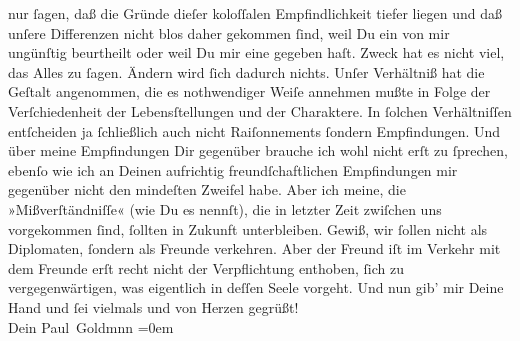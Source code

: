 \begin{ledgroupsized}[t]{13cm}
               nur ſagen, daß die Gründe dieſer koloſſalen Empfindlichkeit tiefer liegen und daß
               unſere Differenzen nicht blos daher gekommen ſind, weil Du ein \label{K_L03194-11v}\label{K_L03194-11h} von mir ungünſtig beurtheilt  oder weil Du mir eine \label{K_L03194-12v}\label{K_L03194-12h} gegeben haſt.\pend
           \pstart
           Zweck hat es nicht viel, das Alles zu ſagen. Ändern wird ſich dadurch nichts. Unſer
               Verhältniß hat die Geſtalt angenommen, {\pb}die es
               nothwendiger Weiſe annehmen mußte in Folge der Verſchiedenheit der Lebensſtellungen
               und der Charaktere. In ſolchen Verhältniſſen entſcheiden ja ſchließlich auch nicht
               Raiſonnements ſondern Empfindungen. Und über meine Empfindungen Dir gegenüber brauche
               ich wohl nicht erſt zu ſprechen, ebenſo wie ich an Deinen aufrichtig
               freundſchaftlichen Empfindungen  mir gegenüber
               nicht den mindeſten Zweifel habe. Aber ich meine, die »Mißverſtändniſſe« (wie Du es
               nennſt), die in letzter Zeit zwiſchen uns vorgekommen ſind, ſollten in Zukunft
               unterbleiben. Gewiß, wir ſollen nicht als Diplomaten, ſondern als Freunde verkehren.
               Aber der Freund iſt im Verkehr mit dem Freunde erſt recht nicht
               der Verpflichtung enthoben, ſich zu vergegenwärtigen, was eigentlich in deſſen Seele
               vorgeht.\pend
           \pstart
           Und nun gib’ mir Deine Hand und ſei  vielmals
               und von Herzen gegrüßt! {\\[\baselineskip]}Dein \spacefill\mbox{Paul Goldmnn}\pend
           \leftskip=0em{}
         

\end{ledgroupsized}
